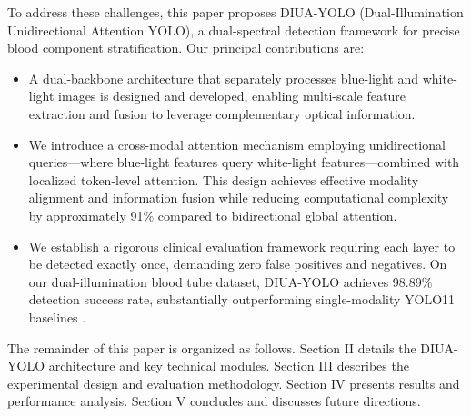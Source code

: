 To address these challenges, this paper proposes DIUA-YOLO (Dual-Illumination Unidirectional Attention YOLO), a dual-spectral detection framework for precise blood component stratification. Our principal contributions are:

\begin{itemize}
    \item A dual-backbone architecture that separately processes blue-light and white-light images is designed and developed, enabling multi-scale feature extraction and fusion to leverage complementary optical information. 
    \item We introduce a cross-modal attention mechanism employing unidirectional queries—where blue-light features query white-light features—combined with localized token-level attention. This design achieves effective modality alignment and information fusion while reducing computational complexity by approximately 91\% compared to bidirectional global attention. 
    \item We establish a rigorous clinical evaluation framework requiring each layer to be detected exactly once, demanding zero false positives and negatives. On our dual-illumination blood tube dataset, DIUA-YOLO achieves 98.89\% detection success rate, substantially outperforming single-modality YOLO11 baselines \cite{yolo11}. 
\end{itemize}

The remainder of this paper is organized as follows. Section II details the DIUA-YOLO architecture and key technical modules. Section III describes the experimental design and evaluation methodology. Section IV presents results and performance analysis. Section V concludes and discusses future directions.